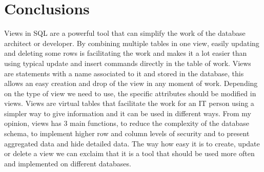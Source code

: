 \section*{Conclusions}


Views in SQL are a powerful tool that can simplify the work of the database architect or developer. By combining multiple tables in one view, easily updating and deleting some rows is facilitating the work and makes it a lot easier than using typical update and insert commands directly in the table of work. Views are statements with a name associated to it and stored in the database, this allows an easy creation and drop of the view in any moment of work. Depending on the type of view we need to use, the specific attributes should be modified in views. Views are virtual tables that facilitate the work for an IT person using a simpler way to give information and it can be used in different ways. From my opinion, views has 3 main functions, to reduce the complexity of the database schema, to implement higher row and column levels of security and to present aggregated data and hide detailed data.
The way how easy it is to create, update or delete a view we can exclaim that it is a tool that should be used more often and implemented on different databases.

\clearpage